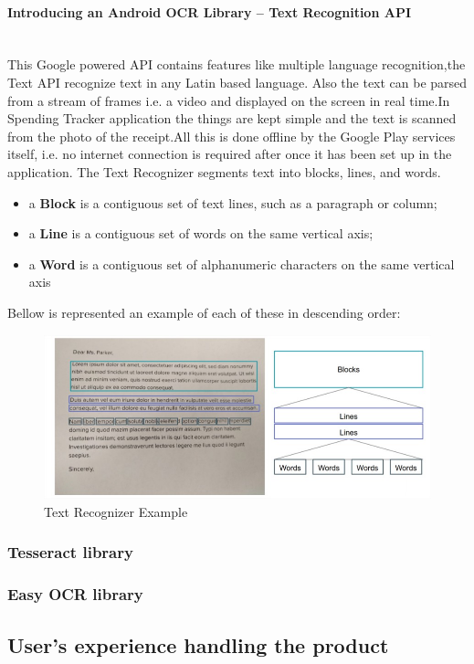 \paragraph{Introducing an Android OCR Library – Text Recognition API}\mbox{}\\
This Google powered API contains features like multiple language recognition,the Text API recognize text in any Latin based language. Also the text can be parsed from a stream of frames i.e. a video and displayed on the screen in real time.In Spending Tracker application the things are kept simple and the text is scanned from the photo of the receipt.All this is done offline by the Google Play services itself, i.e. no internet connection is required after once it has been set up in the application.
The Text Recognizer segments text into blocks, lines, and words.
\begin{itemize}
	\item a \textbf{Block} is a contiguous set of text lines, such as a paragraph or column;
	\item a \textbf{Line} is a contiguous set of words on the same vertical axis;
	\item a \textbf{Word} is a contiguous set of alphanumeric characters on the same vertical axis
\end{itemize}
Bellow is represented an example of each of these in descending order:
\begin{figure}[H]
	\centering
	\includegraphics[width=16cm]{Chapter3/ocrex.jpg}
	\caption{Text Recognizer Example \cite{Text Recognition API}}
	\label{fig:Text Recognizer Example}
\end{figure}
\subsubsection{Tesseract library}
\subsubsection{Easy OCR library}
\subsection{User’s experience handling the product}
